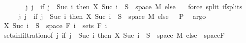 \begin{isabellebody}
\ \ \isamarkupfalse%
\ \isamarkupfalse%
\ {\isachardoublequoteopen}{\isachardot}{\kern0pt}{\isachardot}{\kern0pt}{\isachardot}{\kern0pt}\ {\isacharequal}{\kern0pt}\ {\isacharparenleft}{\kern0pt}{\isasymUnion}j{\isachardot}{\kern0pt}\ {\isacharbraceleft}{\kern0pt}j{\isacharbraceright}{\kern0pt}\ {\isasymtimes}\ {\isacharparenleft}{\kern0pt}if\ j\ {\isacharequal}{\kern0pt}\ Suc\ i\ then\ {\isacharparenleft}{\kern0pt}X\ {\isacharparenleft}{\kern0pt}Suc\ i{\isacharparenright}{\kern0pt}\ {\isacharminus}{\kern0pt}{\isacharbackquote}{\kern0pt}\ S\ {\isasyminter}\ space\ M{\isacharparenright}{\kern0pt}\ else\ {\isacharbraceleft}{\kern0pt}{\isacharbraceright}{\kern0pt}{\isacharparenright}{\kern0pt}{\isacharparenright}{\kern0pt}{\isachardoublequoteclose}\ \isamarkupfalse%
\ {\isacharparenleft}{\kern0pt}force\ split{\isacharcolon}{\kern0pt}\ if{\isacharunderscore}{\kern0pt}splits{\isacharparenright}{\kern0pt}\isanewline
\ \ \isamarkupfalse%
\ \isamarkupfalse%
\ {\isachardoublequoteopen}{\isacharparenleft}{\kern0pt}{\isasymUnion}j{\isachardot}{\kern0pt}\ {\isacharbraceleft}{\kern0pt}j{\isacharbraceright}{\kern0pt}\ {\isasymtimes}\ {\isacharparenleft}{\kern0pt}if\ j\ {\isacharequal}{\kern0pt}\ Suc\ i\ then\ {\isacharparenleft}{\kern0pt}X\ {\isacharparenleft}{\kern0pt}Suc\ i{\isacharparenright}{\kern0pt}\ {\isacharminus}{\kern0pt}{\isacharbackquote}{\kern0pt}\ S\ {\isasyminter}\ space\ M{\isacharparenright}{\kern0pt}\ else\ {\isacharbraceleft}{\kern0pt}{\isacharbraceright}{\kern0pt}{\isacharparenright}{\kern0pt}{\isacharparenright}{\kern0pt}\ {\isasymin}\ {\isasymSigma}\isactrlsub P{\isachardoublequoteclose}\ \isamarkupfalse%
\ argo\isanewline
\ \ \isamarkupfalse%
\ {\isachardoublequoteopen}X\ {\isacharparenleft}{\kern0pt}Suc\ i{\isacharparenright}{\kern0pt}\ {\isacharminus}{\kern0pt}{\isacharbackquote}{\kern0pt}\ S\ {\isasyminter}\ space\ {\isacharparenleft}{\kern0pt}F\ i{\isacharparenright}{\kern0pt}\ {\isasymin}\ sets\ {\isacharparenleft}{\kern0pt}F\ i{\isacharparenright}{\kern0pt}{\isachardoublequoteclose}\ \isamarkupfalse%
\ sets{\isacharunderscore}{\kern0pt}in{\isacharunderscore}{\kern0pt}filtration{\isacharbrackleft}{\kern0pt}of\ {\isachardoublequoteopen}{\isasymlambda}j{\isachardot}{\kern0pt}\ if\ j\ {\isacharequal}{\kern0pt}\ Suc\ i\ then\ {\isacharparenleft}{\kern0pt}X\ {\isacharparenleft}{\kern0pt}Suc\ i{\isacharparenright}{\kern0pt}\ {\isacharminus}{\kern0pt}{\isacharbackquote}{\kern0pt}\ S\ {\isasyminter}\ space\ M{\isacharparenright}{\kern0pt}\ else\ {\isacharbraceleft}{\kern0pt}{\isacharbraceright}{\kern0pt}{\isachardoublequoteclose}{\isacharbrackright}{\kern0pt}\ space{\isacharunderscore}{\kern0pt}F\ \isamarkupfalse%

\end{isabellebody}
